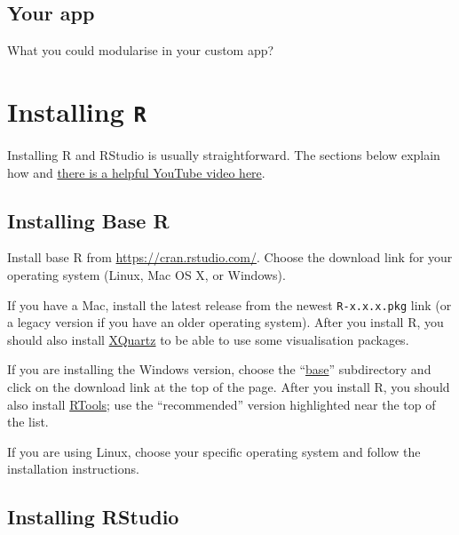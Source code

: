 \documentclass[
  oneside]{book}
\begin{document}
\hypertarget{your-app-modules}{%
\section{Your app}\label{your-app-modules}}

What you could modularise in your custom app?

\hypertarget{appendix-appendices}{%
\appendix}


\hypertarget{installing-r}{%
\chapter{\texorpdfstring{Installing \texttt{R}}{Installing R}}\label{installing-r}}

Installing R and RStudio is usually straightforward. The sections below explain how and \href{https://www.youtube.com/watch?v=lVKMsaWju8w}{there is a helpful YouTube video here}.

\hypertarget{installing-base-r}{%
\section{Installing Base R}\label{installing-base-r}}

Install base R from \url{https://cran.rstudio.com/}. Choose the download link for your operating system (Linux, Mac OS X, or Windows).

If you have a Mac, install the latest release from the newest \texttt{R-x.x.x.pkg} link (or a legacy version if you have an older operating system). After you install R, you should also install \href{http://xquartz.macosforge.org/}{XQuartz} to be able to use some visualisation packages.

If you are installing the Windows version, choose the ``\href{https://cran.rstudio.com/bin/windows/base/}{base}'' subdirectory and click on the download link at the top of the page. After you install R, you should also install \href{https://cran.rstudio.com/bin/windows/Rtools/}{RTools}; use the ``recommended'' version highlighted near the top of the list.

If you are using Linux, choose your specific operating system and follow the installation instructions.

\hypertarget{installing-rstudio}{%
\section{Installing RStudio}\label{installing-rstudio}}
\end{document}
